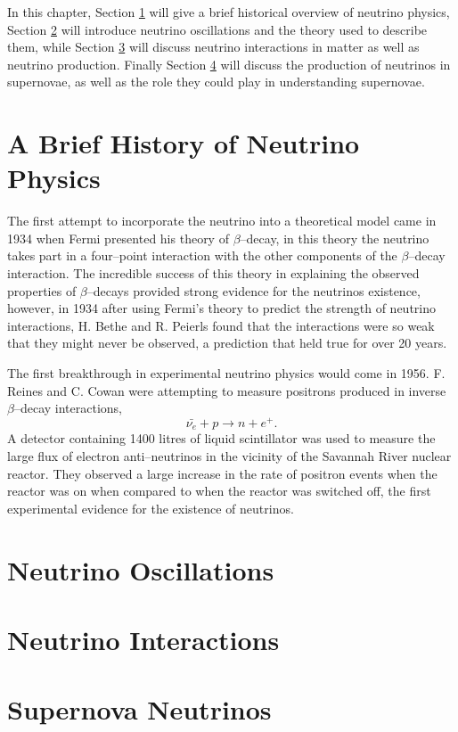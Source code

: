 In this chapter, Section \ref{nu_hist} will give a brief historical overview of 
neutrino physics, Section \ref{nu_osc} will introduce neutrino oscillations
and the theory used to describe them, while Section \ref{nu_prod} will discuss
neutrino interactions in matter as well as neutrino production. Finally Section
\ref{nu_sn} will discuss the production of neutrinos in supernovae, as well as
the role they could play in understanding supernovae.

\section{A Brief History of Neutrino Physics} \label{nu_hist}

The first attempt to incorporate the neutrino into a theoretical model came in
1934 when Fermi presented his theory of \(\beta\)--decay, in this theory the 
neutrino takes part in a four--point interaction with the other components of 
the \(\beta\)--decay interaction. The incredible success of this theory in
explaining the observed properties of \(\beta\)--decays provided strong evidence 
for the neutrinos existence, however, in 1934 after using Fermi's  theory to 
predict the strength of neutrino interactions, H. Bethe and R. Peierls found 
that the interactions were so weak that they might never be observed, a 
prediction that held true for over 20 years.%

The first breakthrough in experimental neutrino physics would come in 1956. F.
Reines and C. Cowan were attempting to measure positrons produced in inverse 
\(\beta\)--decay interactions,
\begin{equation}
	\bar{\nu_e} + p \rightarrow n + e^+.
\end{equation}
A detector containing 1400 litres of liquid scintillator was used to measure the 
large flux of electron anti--neutrinos in the vicinity of the Savannah River 
nuclear reactor. They observed a large increase in the rate of positron events 
when the reactor was on when compared to when the reactor was switched off, the 
first experimental evidence for the existence of neutrinos. %



\section{Neutrino Oscillations} \label{nu_osc}

\section{Neutrino Interactions} \label{nu_prod}

\section{Supernova Neutrinos} \label{nu_sn}
